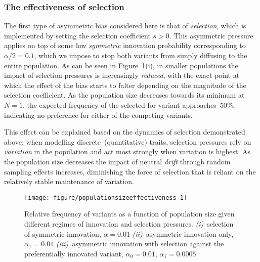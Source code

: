 \subsubsection{The effectiveness of selection}

The first type of asymmetric bias considered here is that of \emph{selection}, which is implemented by setting the selection coefficient $s>0$. This asymmetric pressure applies on top of some low \emph{symmetric} innovation probability corresponding to~$\alpha/2=0.1$, which we impose to stop both variants from simply diffusing to the entire population.
As can be seen in Figure~\ref{fig:populationsizeeffectiveness}(i), in smaller populations the impact of selection pressures is increasingly \emph{reduced}, with the exact point at which the effect of the bias starts to falter depending on the magnitude of the selection coefficient. As the population size decreases towards its minimum at~$N=1$, the expected frequency of the selected for variant approaches~$50\%$, indicating no preference for either of the competing variants.

This effect can be explained based on the dynamics of selection demonstrated above: when modelling discrete~(quantitative) traits, selection pressures rely on \emph{variation} in the population and act most strongly when variation is highest. As the population size decreases the impact of neutral \emph{drift} through random sampling effects increases, diminishing the force of selection that is reliant on the relatively stable maintenance of variation.


\begin{knitrout}
\color{fgcolor}\begin{figure}[htbp]

{\centering \texttt{[image: figure/populationsizeeffectiveness-1]} 

}

\caption[Relative frequency of variants as a function of population size given different regimes of innovation and selection pressures]{Relative frequency of variants as a function of population size given different regimes of innovation and selection pressures. \emph{(i)}~selection of symmetric innovation, $\alpha=0.01$ \emph{(ii)}~asymmetric innovation only, $\alpha_1=0.01$ \emph{(iii)}~asymmetric innovation with selection against the preferentially innovated variant, $\alpha_0=0.01$, $\alpha_1=0.0005$.}\label{fig:populationsizeeffectiveness}
\end{figure}


\end{knitrout}

